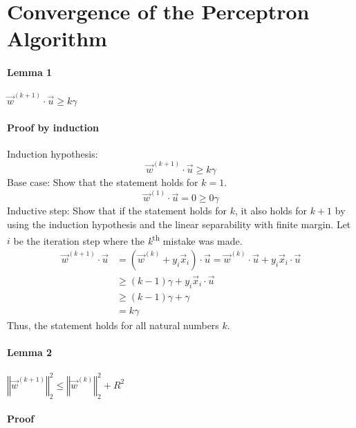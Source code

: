 \section{Convergence of the Perceptron Algorithm}
\paragraph{Lemma 1 }

$\vec{w}^{(k+1)}\cdot\vec{u}\geq k\gamma$


\paragraph*{Proof by induction}

Induction hypothesis:
\[
\vec{w}^{(k+1)}\cdot\vec{u}\geq k\gamma
\]
Base case: Show that the statement holds for $k=1$.
\[
\vec{w}^{(1)}\cdot\vec{u}=0\geq0\gamma
\]
Inductive step: Show that if the statement holds for $k$, it also
holds for $k+1$ by using the induction hypothesis and the linear
separability with finite margin. Let $i$ be the iteration step where
the \emph{k}\textsuperscript{th} mistake was made.
\begin{align*}
\vec{w}^{(k+1)}\cdot\vec{u} & =(\vec{w}^{(k)}+y_{i}\vec{x}_{i})\cdot\vec{u}=\vec{w}^{(k)}\cdot\vec{u}+y_{i}\vec{x}_{i}\cdot\vec{u}\\
 & \geq(k-1)\gamma+y_{i}\vec{x}_{i}\cdot\vec{u}\\
 & \geq(k-1)\gamma+\gamma\\
 & =k\gamma
\end{align*}
Thus, the statement holds for all natural numbers $k$.


\paragraph*{Lemma 2}


\paragraph*{$\left\Vert \vec{w}^{(k+1)}\right\Vert _{2}^{2}\leq\left\Vert \vec{w}^{(k)}\right\Vert _{2}^{2}+R^{2}$}


\paragraph*{Proof}

